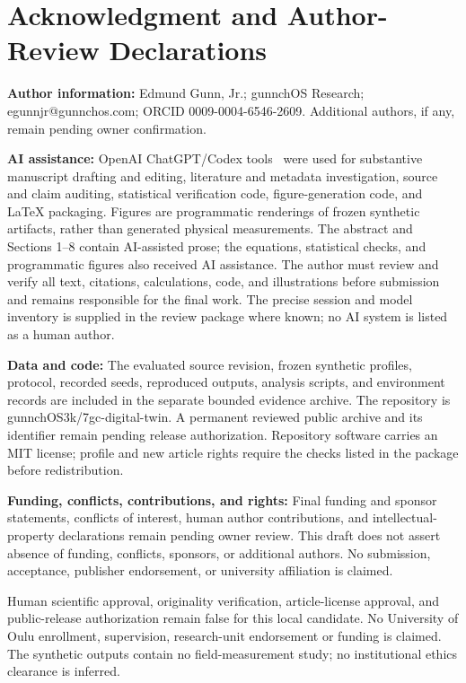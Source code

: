 \section*{Acknowledgment and Author-Review Declarations}
\textbf{Author information:} Edmund Gunn, Jr.; gunnchOS Research; egunnjr@gunnchos.com; ORCID 0009-0004-6546-2609. Additional authors, if any, remain pending owner confirmation.

\textbf{AI assistance:} OpenAI ChatGPT/Codex tools~\cite{openai_codex} were used for substantive manuscript drafting and editing, literature and metadata investigation, source and claim auditing, statistical verification code, figure-generation code, and LaTeX packaging. Figures are programmatic renderings of frozen synthetic artifacts, rather than generated physical measurements. The abstract and Sections 1--8 contain AI-assisted prose; the equations, statistical checks, and programmatic figures also received AI assistance. The author must review and verify all text, citations, calculations, code, and illustrations before submission and remains responsible for the final work. The precise session and model inventory is supplied in the review package where known; no AI system is listed as a human author.

\textbf{Data and code:} The evaluated source revision, frozen synthetic profiles, protocol, recorded seeds, reproduced outputs, analysis scripts, and environment records are included in the separate bounded evidence archive. The repository is gunnchOS3k/7gc-digital-twin. A permanent reviewed public archive and its identifier remain pending release authorization. Repository software carries an MIT license; profile and new article rights require the checks listed in the package before redistribution.

\textbf{Funding, conflicts, contributions, and rights:} Final funding and sponsor statements, conflicts of interest, human author contributions, and intellectual-property declarations remain pending owner review. This draft does not assert absence of funding, conflicts, sponsors, or additional authors. No submission, acceptance, publisher endorsement, or university affiliation is claimed.

Human scientific approval, originality verification, article-license approval, and public-release authorization remain false for this local candidate. No University of Oulu enrollment, supervision, research-unit endorsement or funding is claimed. The synthetic outputs contain no field-measurement study; no institutional ethics clearance is inferred.

